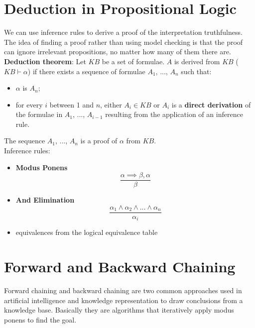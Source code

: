 \documentclass{article}
\begin{document}
\newpage

\section{Deduction in Propositional Logic}

We can use inference rules to derive a proof of the interpretation truthfulness. The idea of finding a proof rather than using model checking is that the proof can ignore irrelevant propositions, no matter how many of them there are. \\

\textbf{Deduction theorem}: Let $KB$ be a set of formulae. $A$ is derived from $KB$ ($KB \vdash \alpha$) if there exists a sequence of formulae $A_1$, ..., $A_n$ such that:

\begin{itemize}
    \item $\alpha$ is $A_n$;
    \item for every $i$ between 1 and $n$, either $A_i \in KB$ or $A_i$ is a \textbf{direct derivation} of the formulae in $A_1$, ..., $A_{i-1}$ resulting from the application of an inference rule.
\end{itemize}

The sequence $A_1$, ..., $A_n$ is a proof of $\alpha$ from $KB$. \\

Inference rules:

\begin{itemize}
    \item \textbf{Modus Ponens}
    \begin{equation*}
        \frac{\alpha \implies \beta, \alpha}{\beta}
    \end{equation*}

    \item \textbf{And Elimination}
    \begin{equation*}
        \frac{\alpha_1 \land \alpha_2 \land ... \land \alpha_n}{\alpha_i}
    \end{equation*}
    \item equivalences from the logical equivalence table
\end{itemize}

\newpage

\section{Forward and Backward Chaining}

Forward chaining and backward chaining are two common approaches used in artificial intelligence and knowledge representation to draw conclusions from a knowledge base. Basically they are algorithms that iteratively apply modus ponens to find the goal.
\end{document}
